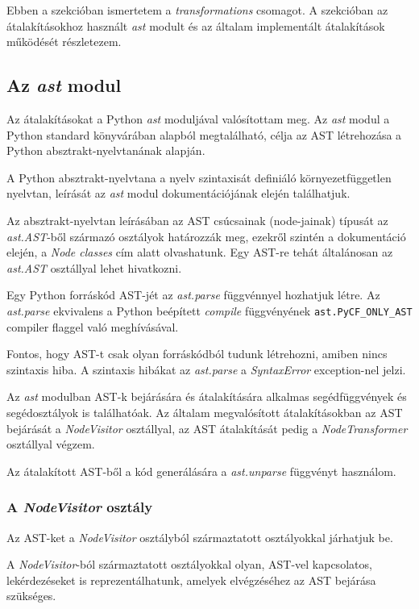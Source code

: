Ebben a szekcióban ismertetem a \emph{transformations} csomagot.
A szekcióban az átalakításokhoz használt \emph{ast} modult és
az általam implementált átalakítások működését részletezem.

\subsection{Az \emph{ast} modul}

Az átalakításokat a Python \emph{ast} moduljával valósítottam meg.
Az \emph{ast} modul a Python standard könyvárában alapból megtalálható, 
célja az AST létrehozása a Python absztrakt-nyelvtanának alapján.

A Python absztrakt-nyelvtana a nyelv szintaxisát definiáló környezetfüggetlen nyelvtan,
leírását az \emph{ast} modul dokumentációjának \cite{pythonAST} elején találhatjuk.

Az absztrakt-nyelvtan leírásában az AST csúcsainak (node-jainak) típusát az
\emph{ast.AST}-ből származó osztályok határozzák meg,
ezekről szintén a dokumentáció elején, a \emph{Node classes} cím alatt olvashatunk.
Egy AST-re tehát általánosan az \emph{ast.AST} osztállyal lehet hivatkozni.

Egy Python forráskód AST-jét az \emph{ast.parse} függvénnyel hozhatjuk létre.
Az \emph{ast.parse} ekvivalens a Python beépített
\emph{compile} függvényének \texttt{ast.PyCF\_ONLY\_AST} compiler flaggel való
meghívásával.

Fontos, hogy AST-t csak olyan forráskódból tudunk létrehozni, amiben nincs
szintaxis hiba.
A szintaxis hibákat az \emph{ast.parse} a \emph{SyntaxError} exception-nel jelzi.

Az \emph{ast} modulban AST-k bejárására és átalakítására alkalmas
segédfüggvények és segédosztályok is találhatóak.
Az általam megvalósított átalakításokban
az AST bejárását a \emph{NodeVisitor} osztállyal,
az AST átalakítását pedig a \emph{NodeTransformer} osztállyal
végzem.

Az átalakított AST-ből a kód generálására a \emph{ast.unparse} függvényt használom.

\subsubsection{A \emph{NodeVisitor} osztály}

Az AST-ket a \emph{NodeVisitor} osztályból származtatott osztályokkal járhatjuk be.

A \emph{NodeVisitor}-ból származtatott osztályokkal olyan, AST-vel kapcsolatos,
lekérdezéseket is reprezentálhatunk, amelyek elvégzéséhez az AST bejárása szükséges.

